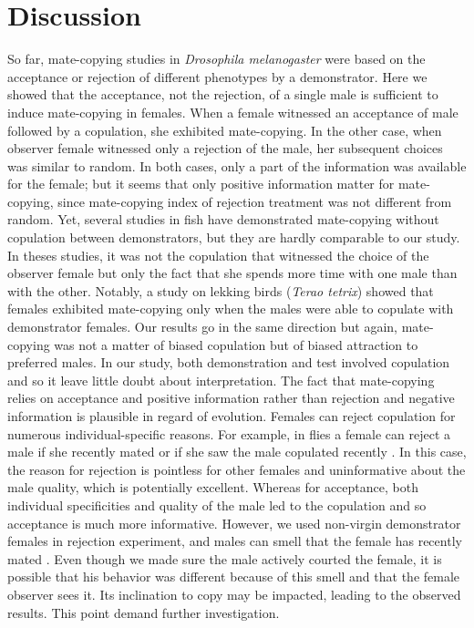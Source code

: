 \documentclass[a4paper, 12pt]{article}
\begin{document}
\clearpage
	


\section{Discussion}

So far, mate-copying studies in \textit{Drosophila melanogaster} were based on the acceptance or rejection of different phenotypes by a demonstrator.
Here we showed that the acceptance, not the rejection, of a single male is sufficient to induce mate-copying in females. 
When a female witnessed an acceptance of male followed by a copulation, she exhibited mate-copying. 
In the other case, when observer female witnessed only a rejection of the male, her subsequent choices was similar to random. 
In both cases, only a part of the information was available for the female; but it seems that only positive information matter for mate-copying, since mate-copying index of rejection treatment was not different from random.
Yet, several studies in fish have demonstrated mate-copying without copulation between demonstrators, but they are hardly comparable to our study. 
In theses studies, it was not the copulation that witnessed the choice of the observer female but only the fact that she spends more time with one male than with the other\parencite{dugatkin_lee_alan_reversal_1992,galef_mate-choice_1998}. 
Notably, a study on lekking birds (\textit{Terao tetrix})  showed that females exhibited mate-copying only when the males were able to copulate with demonstrator females. Our results go in the same direction but again, mate-copying was not a matter of biased copulation but of biased attraction to preferred males. In our study, both demonstration and test involved copulation and so it leave little doubt about interpretation. 
The fact that mate-copying relies on acceptance and positive information rather than rejection and negative information is plausible in regard of evolution.
Females can reject copulation for numerous individual-specific reasons. For example, in flies a female can reject a male if she recently mated \parencite{chapman_sex_2003} or if she saw the male copulated recently \parencite{loyau_when_2012}.
In this case, the reason for rejection is pointless for other females and uninformative about the male quality, which is potentially excellent.
Whereas for acceptance, both individual specificities and quality of the male led to the copulation and so acceptance is much more informative.
However, we used non-virgin demonstrator females in rejection experiment, and males can smell that the female has recently mated \parencite{jallon_few_1984}. 
Even though we made sure the male actively courted the female, it is possible that his behavior was different because of this smell and that the female observer sees it. 
Its inclination to copy may be impacted, leading to the observed results. 
This point demand further investigation.
\end{document}
